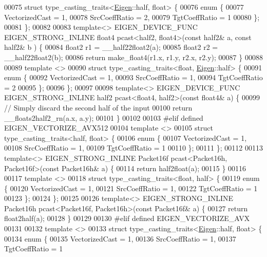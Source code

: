 \begin{DoxyCode}
00075 \textcolor{keyword}{struct }type\_casting\_traits<\hyperlink{namespace_eigen}{Eigen}::half, float> \{
00076   \textcolor{keyword}{enum} \{
00077     VectorizedCast = 1,
00078     SrcCoeffRatio = 2,
00079     TgtCoeffRatio = 1
00080   \};
00081 \};
00082 
00083 \textcolor{keyword}{template}<> EIGEN\_DEVICE\_FUNC EIGEN\_STRONG\_INLINE float4 pcast<half2, float4>(\textcolor{keyword}{const} half2& a, \textcolor{keyword}{const} half2& b
      ) \{
00084   float2 r1 = \_\_half22float2(a);
00085   float2 r2 = \_\_half22float2(b);
00086   \textcolor{keywordflow}{return} make\_float4(r1.x, r1.y, r2.x, r2.y);
00087 \}
00088 
00089 \textcolor{keyword}{template} <>
00090 \textcolor{keyword}{struct }type\_casting\_traits<float, \hyperlink{namespace_eigen}{Eigen}::half> \{
00091   \textcolor{keyword}{enum} \{
00092     VectorizedCast = 1,
00093     SrcCoeffRatio = 1,
00094     TgtCoeffRatio = 2
00095   \};
00096 \};
00097 
00098 \textcolor{keyword}{template}<> EIGEN\_DEVICE\_FUNC EIGEN\_STRONG\_INLINE half2 pcast<float4, half2>(\textcolor{keyword}{const} float4& a) \{
00099   \textcolor{comment}{// Simply discard the second half of the input}
00100   \textcolor{keywordflow}{return} \_\_floats2half2\_rn(a.x, a.y);
00101 \}
00102 
00103 \textcolor{preprocessor}{#elif defined EIGEN\_VECTORIZE\_AVX512}
00104 \textcolor{keyword}{template} <>
00105 \textcolor{keyword}{struct }type\_casting\_traits<half, float> \{
00106   \textcolor{keyword}{enum} \{
00107     VectorizedCast = 1,
00108     SrcCoeffRatio = 1,
00109     TgtCoeffRatio = 1
00110   \};
00111 \};
00112 
00113 \textcolor{keyword}{template}<> EIGEN\_STRONG\_INLINE Packet16f pcast<Packet16h, Packet16f>(\textcolor{keyword}{const} Packet16h& a) \{
00114   \textcolor{keywordflow}{return} half2float(a);
00115 \}
00116 
00117 \textcolor{keyword}{template} <>
00118 \textcolor{keyword}{struct }type\_casting\_traits<float, half> \{
00119   \textcolor{keyword}{enum} \{
00120     VectorizedCast = 1,
00121     SrcCoeffRatio = 1,
00122     TgtCoeffRatio = 1
00123   \};
00124 \};
00125 
00126 \textcolor{keyword}{template}<> EIGEN\_STRONG\_INLINE Packet16h pcast<Packet16f, Packet16h>(\textcolor{keyword}{const} Packet16f& a) \{
00127   \textcolor{keywordflow}{return} float2half(a);
00128 \}
00129 
00130 \textcolor{preprocessor}{#elif defined EIGEN\_VECTORIZE\_AVX}
00131 
00132 \textcolor{keyword}{template} <>
00133 \textcolor{keyword}{struct }type\_casting\_traits<\hyperlink{namespace_eigen}{Eigen}::half, float> \{
00134   \textcolor{keyword}{enum} \{
00135     VectorizedCast = 1,
00136     SrcCoeffRatio = 1,
00137     TgtCoeffRatio = 1

\end{DoxyCode}
